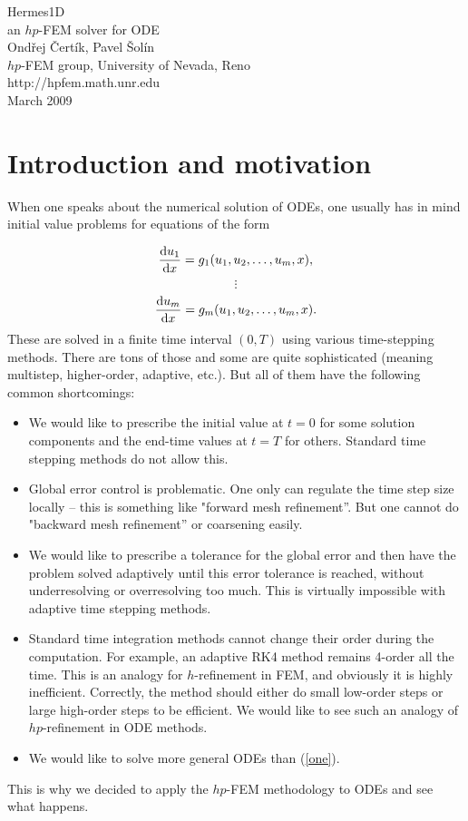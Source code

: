\documentclass[12pt]{article}
\def\be{\begin{equation}}
\def\ee{\end{equation}}
\def\d{\mbox{d}}
\begin{document}
\begin{center}
{\huge Hermes1D}\\[2mm]
{\Large an $hp$-FEM solver for ODE}\\
\vspace{0.6cm}
Ondřej Čertík, Pavel Šolín\\
$hp$-FEM group, University of Nevada, Reno\\
http://hpfem.math.unr.edu\\
March 2009
\end{center}

\section{Introduction and motivation}

When one speaks about the numerical solution of ODEs, one usually has in mind
initial value problems for equations of the form

$$
{\d u_1\over\d x}=g_1(u_1, u_2, \dots, u_m, x),
$$
\be\label{one}
\vdots
\ee
$$
{\d u_m\over\d x}=g_m(u_1, u_2, \dots, u_m, x).
$$
These are solved in a finite time interval $(0,T)$ using various time-stepping
methods. There are tons of those and some are quite sophisticated (meaning
multistep, higher-order, adaptive, etc.). But all of them have the following
common shortcomings:
\begin{itemize}
\item We would like to prescribe the initial value at $t = 0$ for some solution
      components and the end-time values at $t = T$ for others. Standard
      time stepping methods do not allow this.
\item Global error control is problematic. One only can regulate the time step
      size locally -- this is something like
      "forward mesh refinement''. But one cannot do "backward mesh refinement''
      or coarsening easily.
\item We would like to prescribe a tolerance for the global error and then
      have the problem solved adaptively until this error tolerance is reached,
      without underresolving or overresolving too much. This is virtually
      impossible with adaptive time stepping methods.
\item Standard time integration methods cannot change their order during the
      computation. For example, an adaptive RK4 method remains 4-order all the
      time. This is an analogy for $h$-refinement in FEM, and obviously it is
      highly inefficient. Correctly, the method should either do small
      low-order steps or large high-order steps to be efficient. We would like
      to see such an analogy of $hp$-refinement in ODE methods.
\item We would like to solve more general ODEs than (\ref{one}).
\end{itemize}
This is why we decided to apply the $hp$-FEM methodology to ODEs and see what happens.
\end{document}
